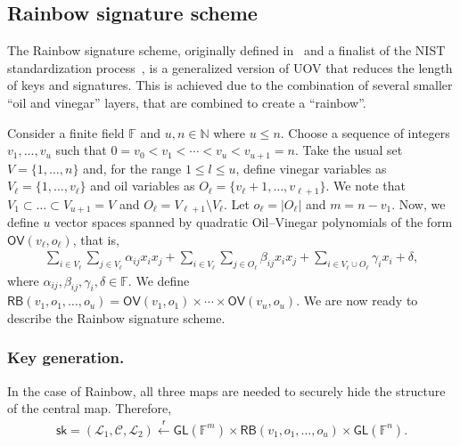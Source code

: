 \documentclass[12pt, a4paper, oneside]{memoir}
\newcommand{\random}{\overset{\mathsf{r}}{\gets}}
\theoremstyle{definition}
\begin{document}
\subsection{Rainbow signature scheme}\label{subsec:rainbow}

The Rainbow signature scheme, originally defined in~\cite{Ding:200506} and a finalist of the NIST standardization process~\cite[Sec.~3.20]{Alagic:202007}, is a generalized version of UOV that reduces the length of keys and signatures. This is achieved due to the combination of several smaller ``oil and vinegar'' layers, that are combined to create a ``rainbow''.

Consider a finite field $\mathbb{F}$ and $u, n \in \mathbb{N}$ where $u \leq n$. Choose a sequence of integers $v_{1}, \dots, v_{u}$ such that $0 = v_{0} < v_{1} < \cdots < v_{u} < v_{u + 1} = n$. Take the usual set $V = \{1, \dots, n\}$ and, for the range $1 \leq l \leq u$, define vinegar variables as $V_{\ell} = \{1, \dots, v_{\ell}\}$ and oil variables as $O_{\ell} = \{v_{\ell} + 1, \dots, v_{\ell + 1}\}$. We note that $V_{1} \subset \dots \subset V_{u + 1} = V$ and $O_{\ell} = V_{\ell + 1} \setminus V_{\ell}$. Let $o_{\ell} = |O_{\ell}|$ and $m = n - v_{1}$. Now, we define $u$ vector spaces spanned by quadratic Oil--Vinegar polynomials of the form $\mathsf{OV}(v_{\ell}, o_{\ell})$, that is,
\begin{align}\label{eq:oil-vinegar-space}
  \sum_{i \in V_{\ell}} \sum_{j \in V_{\ell}} \alpha_{ij} x_{i} x_{j}
    + \sum_{i \in V_{\ell}} \sum_{j \in O_{\ell}} \beta_{ij} x_{i} x_{j}
    + \sum_{i \in V_{\ell} \cup O_{\ell}} \gamma_{i} x_{i} + \delta,
\end{align}
where $\alpha_{ij}, \beta_{ij}, \gamma_{i}, \delta \in \mathbb{F}$. We define $\mathsf{RB}(v_{1}, o_{1}, \dots, o_{u}) = \mathsf{OV}(v_{1}, o_{1}) \times \cdots \times \mathsf{OV}(v_{u}, o_{u})$. We are now ready to describe the Rainbow signature scheme.

\subsubsection{Key generation.}

In the case of Rainbow, all three maps are needed to securely hide the structure of the central map. Therefore,
\begin{align}\label{eq:sk-rainbow}
  \mathsf{sk} = (\mathcal{L}_{1}, \mathcal{C}, \mathcal{L}_{2}) 
    \random \mathsf{GL}(\mathbb{F}^{m}) \times \mathsf{RB}(v_{1}, o_{1}, \dots, o_{u}) \times \mathsf{GL}(\mathbb{F}^{n}).
\end{align}
\end{document}
